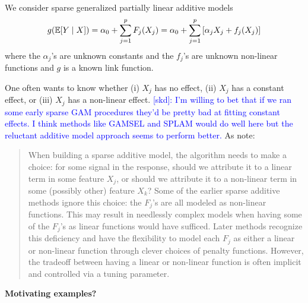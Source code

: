 
We consider sparse generalized partially linear additive models
$$
g(\mathbb{E}[Y \mid X]) = \alpha_{0} + \sum_{j = 1}^{p}{F_{j}(X_{j})} = \alpha_{0} + \sum_{j = 1}^{p}{[\alpha_{j}X_{j} + f_{j}(X_{j})]}
$$
where the $\alpha_{j}$'s are unknown constants and the $f_{j}$'s are unknown non-linear functions and $g$ is a known link function.

One often wants to know whether (i) $X_{j}$ has no effect, (ii) $X_{j}$ has a constant effect, or (iii) $X_{j}$ has a non-linear effect.
\textcolor{blue}{[skd]: I'm willing to bet that if we ran some early sparse GAM procedures they'd be pretty bad at fitting constant effects. I think methods like GAMSEL \citep{ChouldechovaHastie2015} and SPLAM \citep{Lou2016} would do well here but the reluctant additive model approach seems to perform better.}
As \citet{TayTibshirani2020} note:
\begin{quote}
\singlespacing
\small
When building a sparse additive model, the algorithm needs to make a choice: for some signal in the response, should we attribute it to a linear term in some feature $X_{j}$, or should we attribute it to a non-linear term in some (possibly other) feature $X_{k}$? Some of the earlier sparse additive methods ignore this choice: the $F_{j}$'s are all modeled as non-linear functions. This may result in needlessly complex models when having some of the $F_{j}$'s as linear functions would have sufficed. Later methods recognize this deficiency and have the flexibility to model each $F_{j}$ as either a linear or non-linear function through clever choices of penalty functions. However, the tradeoff between having a linear or non-linear function is often implicit and controlled via a tuning parameter.
\end{quote}



\textbf{Motivating examples?}
